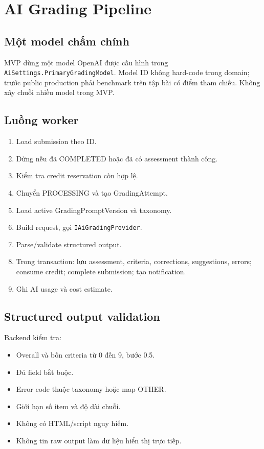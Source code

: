 \documentclass[11pt,a4paper]{article}
\begin{document}
\section{AI Grading Pipeline}

\subsection{Một model chấm chính}
MVP dùng một model OpenAI được cấu hình trong \texttt{AiSettings.PrimaryGradingModel}. Model ID không hard-code trong domain; trước public production phải benchmark trên tập bài có điểm tham chiếu. Không xây chuỗi nhiều model trong MVP.

\subsection{Luồng worker}
\begin{enumerate}
  \item Load submission theo ID.
  \item Dừng nếu đã COMPLETED hoặc đã có assessment thành công.
  \item Kiểm tra credit reservation còn hợp lệ.
  \item Chuyển PROCESSING và tạo GradingAttempt.
  \item Load active GradingPromptVersion và taxonomy.
  \item Build request, gọi \texttt{IAiGradingProvider}.
  \item Parse/validate structured output.
  \item Trong transaction: lưu assessment, criteria, corrections, suggestions, errors; consume credit; complete submission; tạo notification.
  \item Ghi AI usage và cost estimate.
\end{enumerate}

\subsection{Structured output validation}
Backend kiểm tra:
\begin{itemize}
  \item Overall và bốn criteria từ 0 đến 9, bước 0.5.
  \item Đủ field bắt buộc.
  \item Error code thuộc taxonomy hoặc map OTHER.
  \item Giới hạn số item và độ dài chuỗi.
  \item Không có HTML/script nguy hiểm.
  \item Không tin raw output làm dữ liệu hiển thị trực tiếp.
\end{itemize}
\end{document}

